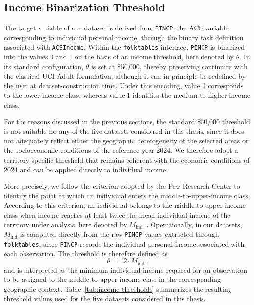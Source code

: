 \subsection{Income Binarization Threshold}
The target variable of our dataset is derived from \texttt{PINCP}, the ACS variable corresponding to individual personal income, through the binary task definition associated with \texttt{ACSIncome}. Within the \texttt{folktables} interface, \texttt{PINCP} is binarized into the values $0$ and $1$ on the basis of an income threshold, here denoted by $\theta$. In its standard configuration, $\theta$ is set at \$50,000, thereby preserving continuity with the classical UCI Adult formulation, although it can in principle be redefined by the user at dataset-construction time. Under this encoding, value $0$ corresponds to the lower-income class, whereas value $1$ identifies the medium-to-higher-income class.

For the reasons discussed in the previous sections, the standard \$50,000 threshold is not suitable for any of the five datasets considered in this thesis, since it does not adequately reflect either the geographic heterogeneity of the selected areas or the socioeconomic conditions of the reference year 2024. We therefore adopt a territory-specific threshold that remains coherent with the economic conditions of 2024 and can be applied directly to individual income.

More precisely, we follow the criterion adopted by the Pew Research Center to identify the point at which an individual enters the middle-to-upper-income class. According to this criterion, an individual belongs to the middle-to-upper-income class when income reaches at least twice the mean individual income of the territory under analysis, here denoted by $M_{\mathrm{ind}}$~\cite{pew2024middleclassmethodology,kochhar2022pew}. Operationally, in our datasets, $M_{\mathrm{ind}}$ is computed directly from the raw \texttt{PINCP} values extracted through \texttt{folktables}, since \texttt{PINCP} records the individual personal income associated with each observation. The threshold is therefore defined as
$$
  \theta \;=\; 2 \cdot M_{\mathrm{ind}},
$$
and is interpreted as the minimum individual income required for an observation to be assigned to the middle-to-upper-income class in the corresponding geographic context. Table~\ref{tab:income-thresholds} summarizes the resulting threshold values used for the five datasets considered in this thesis.

